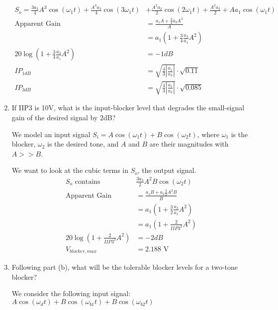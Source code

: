\begin{enumerate}[label=(\alph*)]
    \begin{align*}
        S_o = \frac{3 a_{3}}{4} A^{3} \cos{\left (\omega_1 t \right )} + \frac{A^{3} a_{3}}{4} \cos{\left (3 \omega_1 t \right )} &+ \frac{A^{2} a_{2}}{2} \cos{\left (2 \omega_1 t \right )} + \frac{A^{2} a_{2}}{2} + A a_{1} \cos{\left (\omega_1 t \right )} \\
        \text{Apparent Gain} &= \frac{a_1 A + \frac{3}{4} a_3 A^3}{A} \\
        &= a_1 (1 + \frac{3}{4} \frac{a_3}{a_1} A^2) \\
        20 \log(1 + \frac{3}{4} \frac{a_3}{a_1} A^2) &= -1 dB \\
        IP_{1dB} &= \sqrt{\frac{4}{3} |\frac{a_1}{a_3}|} \cdot \sqrt{0.11} \\
        IP_{3dB} &= \sqrt{\frac{4}{3} |\frac{a_1}{a_3}|} \cdot \sqrt{0.085}
    \end{align*}

    \item {\color{blue} If IIP3 is 10V, what is the input-blocker level that degrades the small-signal gain of the desired signal by 2dB?}

    We model an input signal $S_i = A \cos{\left (\omega_1 t \right )} + B \cos{\left (\omega_2 t \right )}$, where $\omega_1$ is the blocker, $\omega_2$ is the desired tone, and $A$ and $B$ are their magnitudes with $A >> B$.

    We want to look at the cubic terms in $S_o$, the output signal.
    \begin{align*}
        S_o \text{ contains }& \frac{3 a_{3}}{2} A^{2} B \cos{\left (\omega_2 t \right )} \\
        \text{Apparent Gain} &= \frac{a_1 B + a_3 \frac{3}{2} A^2 B}{B} \\
        &= a_1 (1 + \frac{3}{2} \frac{a_3}{a_1} A^2) \\
        &= a_1 (1 + \frac{2}{IIP3^2} A^2) \\
        20 \log(1 + \frac{2}{IIP3^2} A^2) &= -2 dB \\
        V_{blocker,max} &= 2.188 \text{ V}
    \end{align*}

    \item {\color{blue} Following part (b), what will be the tolerable blocker levels for a two-tone blocker?}

    We consider the following input signal: $ A \cos{\left (\omega_{d} t \right )} + B \cos{\left (\omega_{b1} t \right )} + B \cos{\left (\omega_{b2} t \right )} $


\end{enumerate}
